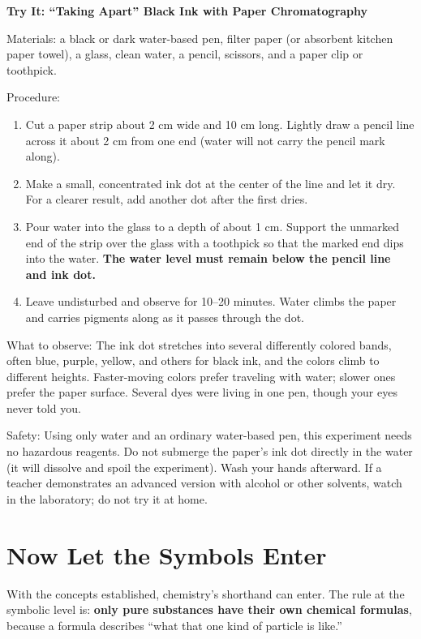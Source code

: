 \begin{shiyan}
\textbf{Try It: ``Taking Apart'' Black Ink with Paper Chromatography}

Materials: a black or dark water-based pen, filter paper (or absorbent kitchen paper towel), a glass, clean water, a pencil, scissors, and a paper clip or toothpick.

Procedure:
\begin{enumerate}[itemsep=1pt]
\item Cut a paper strip about 2 cm wide and 10 cm long. Lightly draw a pencil line across it about 2 cm from one end (water will not carry the pencil mark along).
\item Make a small, concentrated ink dot at the center of the line and let it dry. For a clearer result, add another dot after the first dries.
\item Pour water into the glass to a depth of about 1 cm. Support the unmarked end of the strip over the glass with a toothpick so that the marked end dips into the water. \textbf{The water level must remain below the pencil line and ink dot.}
\item Leave undisturbed and observe for 10--20 minutes. Water climbs the paper and carries pigments along as it passes through the dot.
\end{enumerate}

What to observe: The ink dot stretches into several differently colored bands, often blue, purple, yellow, and others for black ink, and the colors climb to different heights. Faster-moving colors prefer traveling with water; slower ones prefer the paper surface. Several dyes were living in one pen, though your eyes never told you.

Safety: Using only water and an ordinary water-based pen, this experiment needs no hazardous reagents. Do not submerge the paper's ink dot directly in the water (it will dissolve and spoil the experiment). Wash your hands afterward. If a teacher demonstrates an advanced version with alcohol or other solvents, watch in the laboratory; do not try it at home.
\end{shiyan}

\section{Now Let the Symbols Enter}

With the concepts established, chemistry's shorthand can enter. The rule at the symbolic level is: \textbf{only pure substances have their own chemical formulas}, because a formula describes ``what that one kind of particle is like.''

